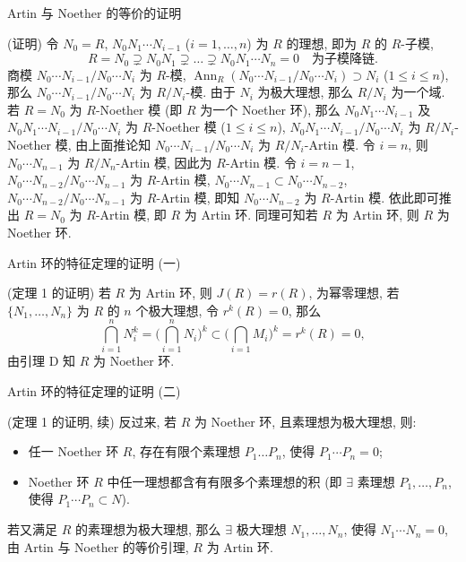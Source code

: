 \begin{frame}{Artin 与 Noether 的等价的证明}

\startproof[bg=yellow, fg=red](证明)
令 $N_0 = R$, $N_0 N_1 \dotsm N_{i-1}$ ($i = 1, \dots, n$) 为 $R$ 的理想,
即为 $R$ 的 $R$-子模,
\[
R = N_0 \supsetneq N_0 N_1 \supsetneq \dots \supsetneq N_0 N_1 \dotsm N_n = 0
\quad \text{为子模降链}.
\]
商模 $N_0 \dotsm N_{i-1} / N_0 \dotsm N_i$ 为 $R$-模,
$\operatorname{Ann}_R(N_0 \dotsm N_{i-1} / N_0 \dotsm N_i) \supset N_i$
($1 \leqslant i \leqslant n$),
那么 $N_0 \dotsm N_{i-1} / N_0 \dotsm N_i$ 为 $R/N_i$-模.
由于 $N_i$ 为极大理想, 那么 $R/N_i$ 为一个域.
\pause
若 $R = N_0$ 为 $R$-Noether 模 (即 $R$ 为一个 Noether 环),
那么 $N_0 N_1 \dotsm N_{i-1}$ 及
$N_0 N_1 \dotsm N_{i-1} / N_0 \dotsm N_i$ 为 $R$-Noether 模
($1 \leqslant i \leqslant n$),
$N_0 N_1 \dotsm N_{i-1} / N_0 \dotsm N_i$ 为 $R/N_i$-Noether 模,
由上面推论知
$N_0 \dotsm N_{i-1} / N_0 \dotsm N_i$ 为 $R/N_i$-Artin 模.
令 $i = n$, 则 $N_0 \dotsm N_{n-1}$ 为 $R/N_n$-Artin 模,
因此为 $R$-Artin 模.
令 $i = n - 1$, $N_0 \dotsm N_{n-2} / N_0 \dotsm N_{n-1}$ 为 $R$-Artin 模,
$N_0 \dotsm N_{n-1} \subset N_0 \dotsm N_{n-2}$,
$N_0 \dotsm N_{n-2} / N_0 \dotsm N_{n-1}$ 为 $R$-Artin 模,
即知 $N_0 \dotsm N_{n-2}$ 为 $R$-Artin 模.
依此即可推出 $R = N_0$ 为 $R$-Artin 模, 即 $R$ 为 Artin 环.
同理可知若 $R$ 为 Artin 环, 则 $R$ 为 Noether 环.

\end{frame}


\begin{frame}{Artin 环的特征定理的证明 (一)}

\startproof[bg=yellow, fg=red](定理 1 的证明)
若 $R$ 为 Artin 环, 则 $J(R) = r(R)$, 为幂零理想,
若 $\{N_1, \dots, N_n\}$ 为 $R$ 的 $n$ 个极大理想, 令 $r^k(R) = 0$,
那么
\[
\bigcap_{i=1}^{n} N_i^k = \Big( \bigcap_{i=1}^{n} N_i \Big)^{\!k}
\subset \Big( \bigcap_{i=1} M_i \Big)^{\!k} = r^k(R) = 0,
\]
由引理 D 知 $R$ 为 Noether 环.

\end{frame}


\begin{frame}{Artin 环的特征定理的证明 (二)}

\startproof[bg=yellow, fg=red](定理 1 的证明, 续)
反过来, 若 $R$ 为 Noether 环, 且素理想为极大理想, 则:
\begin{itemize}
\item {} 任一 Noether 环 $R$, 存在有限个素理想 $P_1 \dots P_n$,
  使得 $P_1 \dotsm P_n = 0$;
\item {} Noether 环 $R$ 中任一理想都含有有限多个素理想的积
  (即 $\exists$ 素理想 $P_1, \dots, P_n$,
  使得 $P_1 \dotsm P_n \subset N$).
\end{itemize}
若又满足 $R$ 的素理想为极大理想, 那么 $\exists$ 极大理想 $N_1, \dots, N_n$,
使得 $N_1 \dotsm N_n = 0$, 由 Artin 与 Noether 的等价引理,
$R$ 为 Artin 环.

\end{frame}



